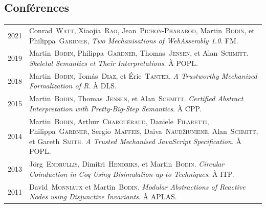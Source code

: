 \documentclass[12pt,a4paper]{article}
\makeatletter
\newenvironment{datecvsection}[1]%
               {\subsection*{#1}%
                 \noindent \begin{longtable}{@{}p{\annee}p{\texte}@{}}}
               {\end{longtable}}
\newcommand\familyName{\textsc}
\makeatother
\begin{document}
\begin{datecvsection}{Conférences}

	2021 & Conrad~\familyName{Watt}, Xiaojia~\familyName{Rao}, Jean~\familyName{Pichon-Pharabod}, Martin~\familyName{Bodin}, et Philippa~\familyName{Gardner}, \textit{Two Mechanisations of WebAssembly 1.0}. FM. \\

  2019 & Martin~\familyName{Bodin}, Philippa~\familyName{Gardner}, Thomas~\familyName{Jensen}, et Alan~\familyName{Schmitt}. \textit{Skeletal Semantics et Their Interpretations}. À POPL. \\

  2018 & Martin~\familyName{Bodin}, Tomás~\familyName{Diaz}, et Éric~\familyName{Tanter}. \textit{A Trustworthy Mechanized Formalization of R}. À DLS. \\

  2015 & Martin~\familyName{Bodin}, Thomas~\familyName{Jensen}, et Alan~\familyName{Schmitt}. \textit{Certified Abstract Interpretation with Pretty-Big-Step Semantics}. À CPP. \\

  2014 & Martin~\familyName{Bodin}, Arthur~\familyName{Charguéraud}, Daniele~\familyName{Filaretti}, Philippa~\familyName{Gardner}, Sergio~\familyName{Maffeis}, Daiva~\familyName{Naudžiūnienė}, Alan~\familyName{Schmitt}, et Gareth~\familyName{Smith}. \textit{A Trusted Mechanised JavaScript Specification}. À POPL. \\

  2013 & Jörg~\familyName{Endrullis}, Dimitri~\familyName{Hendriks}, et Martin~\familyName{Bodin}. \textit{Circular Coinduction in Coq Using Bisimulation-up-to Techniques}. À ITP. \\

  2011 & David~\familyName{Monniaux} et Martin~\familyName{Bodin}. \textit{Modular Abstractions of Reactive Nodes using Disjunctive Invariants}. À APLAS. \\

\end{datecvsection}
\end{document}

